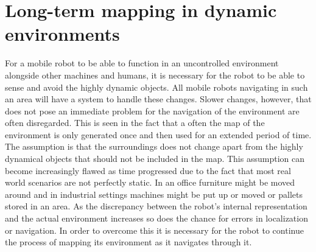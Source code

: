 \chapter{Long-term mapping in dynamic environments}
\label{long_term_mapping}
For a mobile robot to be able to function in an uncontrolled environment alongside other machines and humans, it is necessary for the robot to be able to sense and avoid the highly dynamic objects. All mobile robots navigating in such an area will have a system to handle these changes. Slower changes, however, that does not pose an immediate problem for the navigation of the environment are often disregarded. This is seen in the fact that a often the map of the environment is only generated once and then used for an extended period of time. The assumption is that the surroundings does not change apart from the highly dynamical objects that should not be included in the map. This assumption can become increasingly flawed as time progressed due to the fact that most real world scenarios are not perfectly static. In an office furniture might be moved around and in industrial settings machines might be put up or moved or pallets stored in an area. As the discrepancy between the robot's internal representation and the actual environment increases so does the chance for errors in localization or navigation. In order to overcome this it is necessary for the robot to continue the process of mapping its environment as it navigates through it.
%






